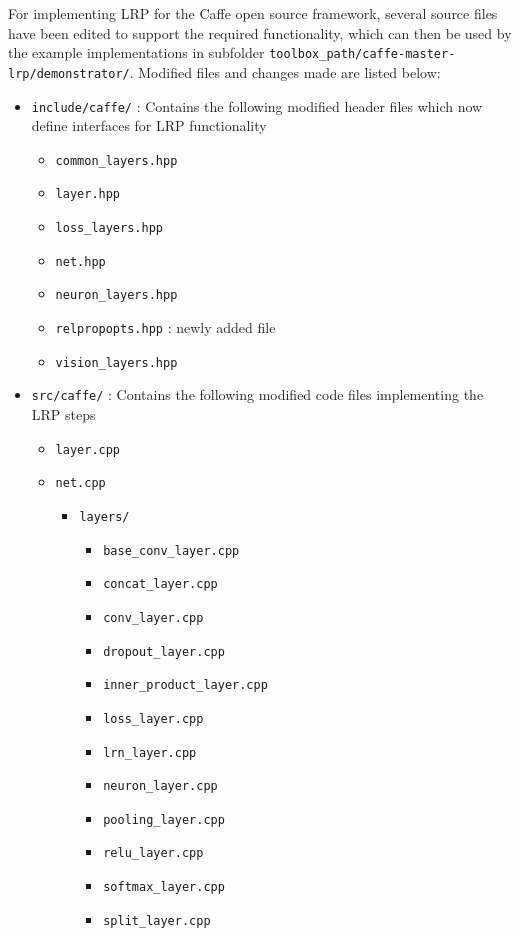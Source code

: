 \documentclass[a4wide]{article}
\begin{document}
For implementing LRP for the Caffe open source framework, several source files have been edited to support the required functionality, which can then be used by the example implementations in subfolder \texttt{toolbox\_path/caffe-master-lrp/demonstrator/}. Modified files and changes made are listed below:
\begin{itemize}
\item \texttt{include/caffe/} : Contains the following modified header files which now define interfaces for LRP functionality
\begin{itemize}
	\item \texttt{common\_layers.hpp}
	\item \texttt{layer.hpp}
	\item \texttt{loss\_layers.hpp}
	\item \texttt{net.hpp}
	\item \texttt{neuron\_layers.hpp}
	\item \texttt{relpropopts.hpp} : newly added file
	\item \texttt{vision\_layers.hpp}
\end{itemize}


\item \texttt{src/caffe/} : Contains the following modified code files implementing the LRP steps
\begin{itemize}
	\item \texttt{layer.cpp}
	\item \texttt{net.cpp}
	\begin{itemize}
		\item \texttt{layers/}
		\begin{itemize}
			\item \texttt{base\_conv\_layer.cpp}
			\item \texttt{concat\_layer.cpp}
			\item \texttt{conv\_layer.cpp}
			\item \texttt{dropout\_layer.cpp}
			\item \texttt{inner\_product\_layer.cpp}
			\item \texttt{loss\_layer.cpp}
			\item \texttt{lrn\_layer.cpp}
			\item \texttt{neuron\_layer.cpp}
			\item \texttt{pooling\_layer.cpp}
			\item \texttt{relu\_layer.cpp}
			\item \texttt{softmax\_layer.cpp}
			\item \texttt{split\_layer.cpp}
		\end{itemize}
	\end{itemize}
\end{itemize}


\end{itemize}
\end{document}
